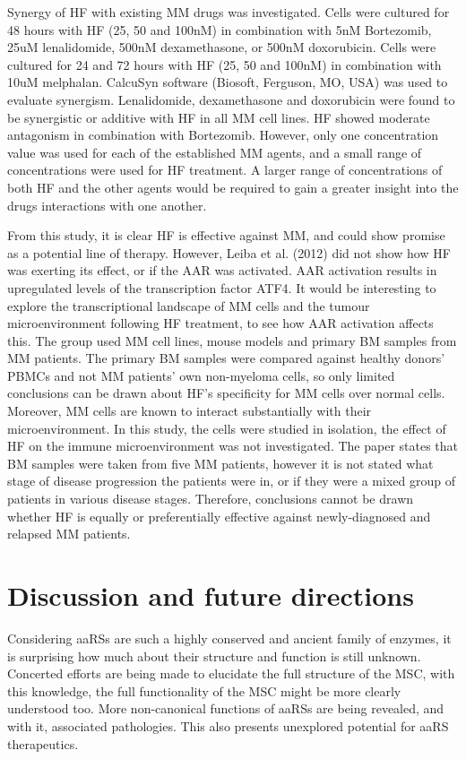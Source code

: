 Synergy of HF with existing MM drugs was investigated\cite{leiba2012halofuginone}.
Cells were cultured for 48 hours with HF (25, 50 and 100nM) in combination with 5nM Bortezomib, 25uM lenalidomide, 500nM dexamethasone, or 500nM doxorubicin. Cells were cultured for 24 and 72 hours with HF (25, 50 and 100nM) in combination with 10uM melphalan.
CalcuSyn software (Biosoft, Ferguson, MO, USA) was used to evaluate synergism.
Lenalidomide, dexamethasone and doxorubicin were found to be synergistic or additive with HF in all MM cell lines.
HF showed moderate antagonism in combination with Bortezomib.
However, only one concentration value was used for each of the established MM agents, and a small range of concentrations were used for HF treatment.
A larger range of concentrations of both HF and the other agents would be required to gain a greater insight into the drugs interactions with one another.

From this study, it is clear HF is effective against MM, and could show promise as a potential line of therapy.
However, Leiba et al. (2012) did not show how HF was exerting its effect, or if the AAR was activated.
AAR activation results in upregulated levels of the transcription factor ATF4.
It would be interesting to explore the transcriptional landscape of MM cells and the tumour microenvironment following HF treatment, to see how AAR activation affects this.
The group used MM cell lines, mouse models and primary BM samples from MM patients.
The primary BM samples were compared against healthy donors' PBMCs and not MM patients' own non-myeloma cells, so only limited conclusions can be drawn about HF's specificity for MM cells over normal cells.
Moreover, MM cells are known to interact substantially with their microenvironment.
In this study, the cells were studied in isolation, the effect of HF on the immune microenvironment was not investigated.
The paper states that BM samples were taken from five MM patients, however it is not stated what stage of disease progression the patients were in, or if they were a mixed group of patients in various disease stages.
Therefore, conclusions cannot be drawn whether HF is equally or preferentially effective against newly-diagnosed and relapsed MM patients.

\section{Discussion and future directions}

Considering aaRSs are such a highly conserved and ancient family of enzymes, it is surprising how much about their structure and function is still unknown.
Concerted efforts are being made to elucidate the full structure of the MSC, with this knowledge, the full functionality of the MSC might be more clearly understood too.
More non-canonical functions of aaRSs are being revealed, and with it, associated pathologies.
This also presents unexplored potential for aaRS therapeutics.

